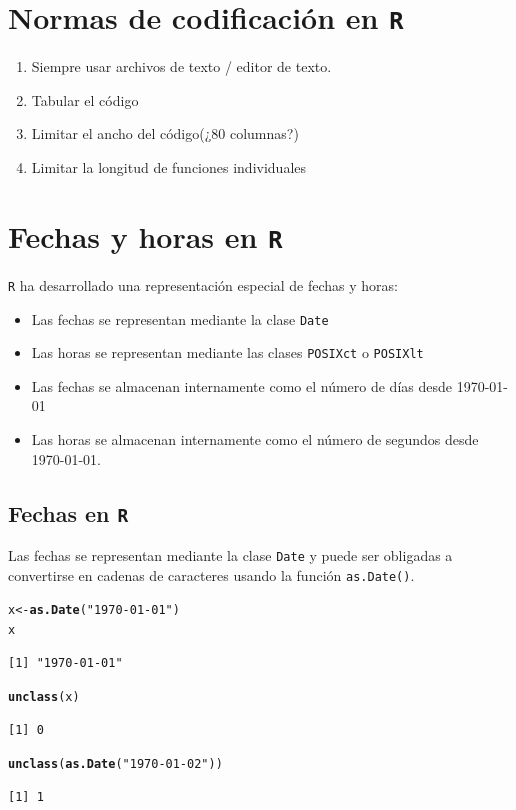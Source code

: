 \documentclass{article}\usepackage[]{graphicx}\usepackage[]{color}
\makeatletter
\newcommand{\hlstr}[1]{\textcolor[rgb]{0.192,0.494,0.8}{#1}}%
\newcommand{\hlstd}[1]{\textcolor[rgb]{0.345,0.345,0.345}{#1}}%
\newcommand{\hlkwb}[1]{\textcolor[rgb]{0.69,0.353,0.396}{#1}}%
\newcommand{\hlkwd}[1]{\textcolor[rgb]{0.737,0.353,0.396}{\textbf{#1}}}%
\newenvironment{kframe}{%
 \def\at@end@of@kframe{}%
 \ifinner\ifhmode%
  \def\at@end@of@kframe{\end{minipage}}%
  \begin{minipage}{\columnwidth}%
 \fi\fi%
 \def\FrameCommand##1{\hskip\@totalleftmargin \hskip-\fboxsep
 \colorbox{shadecolor}{##1}\hskip-\fboxsep
     \hskip-\linewidth \hskip-\@totalleftmargin \hskip\columnwidth}%
 \MakeFramed {\advance\hsize-\width
   \@totalleftmargin\z@ \linewidth\hsize
   \@setminipage}}%
 {\par\unskip\endMakeFramed%
 \at@end@of@kframe}
\newenvironment{knitrout}{}{} %
\makeatother
\begin{document}
\section{Normas de codificación en \texttt{R}}
\begin{enumerate}
  \item Siempre usar archivos de texto / editor de texto.
  \item Tabular el código
  \item Limitar el ancho del código(¿80 columnas?)
  \item Limitar la longitud de funciones individuales
\end{enumerate}

\section{Fechas y horas en \texttt{R}}
\texttt{R} ha desarrollado una representación especial de fechas y horas:
\begin{itemize}
  \item Las fechas se representan mediante la clase \texttt{Date}
  \item Las horas se representan mediante las clases \texttt{POSIXct} o \texttt{POSIXlt}
  \item Las fechas se almacenan internamente como el número de días desde 1970-01-01
  \item Las horas se almacenan internamente como el número de segundos desde 1970-01-01.
\end{itemize}

  \subsection{Fechas en \texttt{R}}
  Las fechas se representan mediante la clase \texttt{Date} y puede ser obligadas a convertirse en cadenas de caracteres usando la función \texttt{as.Date()}.
\begin{knitrout}
\color{fgcolor}\begin{kframe}
\begin{alltt}
  \hlstd{x} \hlkwb{<-} \hlkwd{as.Date}\hlstd{(}\hlstr{"1970-01-01"}\hlstd{)}
  \hlstd{x}
\end{alltt}
\begin{verbatim}
[1] "1970-01-01"
\end{verbatim}
\begin{alltt}
  \hlkwd{unclass}\hlstd{(x)}
\end{alltt}
\begin{verbatim}
[1] 0
\end{verbatim}
\begin{alltt}
  \hlkwd{unclass}\hlstd{(}\hlkwd{as.Date}\hlstd{(}\hlstr{"1970-01-02"}\hlstd{))}
\end{alltt}
\begin{verbatim}
[1] 1
\end{verbatim}
\end{kframe}
\end{knitrout}
\end{document}
